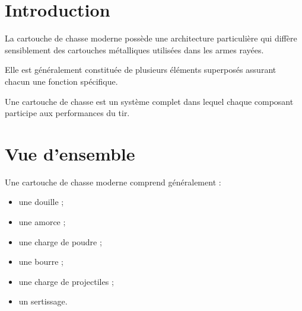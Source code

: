 
\section{Introduction}

La cartouche de chasse moderne possède une architecture particulière qui
diffère sensiblement des cartouches métalliques utilisées dans les armes
rayées.

Elle est généralement constituée de plusieurs éléments superposés assurant
chacun une fonction spécifique.

\begin{aretenir}

Une cartouche de chasse est un système complet dans lequel chaque composant
participe aux performances du tir.

\end{aretenir}

\section{Vue d'ensemble}

Une cartouche de chasse moderne comprend généralement :

\begin{itemize}
    \item une douille ;
    \item une amorce ;
    \item une charge de poudre ;
    \item une bourre ;
    \item une charge de projectiles ;
    \item un sertissage.
\end{itemize}

